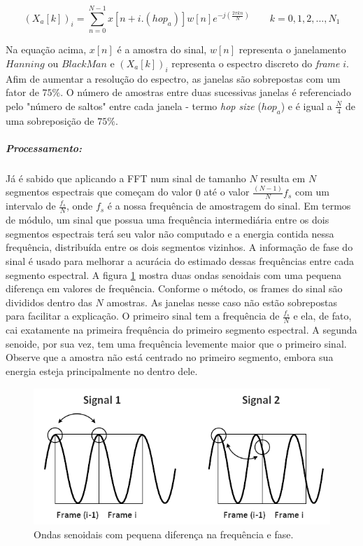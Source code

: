 					\begin{equation}
						(X_a[k])_i = \sum_{n=0}^{N-1}x[n+i.(hop_a)]w[n]e^{-j(\frac{2\pi kn}{N})}
						\qquad k = 0,1,2,...,N_1
						\label{eq-phase-vocoder01}
					\end{equation}
					
					Na equação acima, $ x[n] $ é a amostra do sinal, $ w[n] $ representa o janelamento $ Hanning $ ou $ BlackMan $ e $ (X_a[k])_i $ representa o espectro discreto do \textit{frame} $ i $. Afim de aumentar a resolução do espectro, as janelas são sobrepostas com um fator de $ 75\% $. O número de amostras entre duas sucessivas janelas é referenciado pelo "número de saltos" entre cada janela -  termo \textit{hop size} ($ hop_a $) e é igual a $ \frac{N}{4} $ de uma sobreposição de $ 75\% $.
				
				
				\subparagraph{Processamento:}
				
					Já é sabido que aplicando a FFT num sinal de tamanho $ N $ resulta em $ N $ segmentos espectrais que começam do valor $ 0 $ até o valor $ \frac{(N-1)}{N}f_s $ com um intervalo de $ \frac{f_s}{N} $, onde $ f_s $ é a nossa frequência de amostragem do sinal. Em termos de módulo, um sinal que possua uma frequência intermediária entre os dois segmentos espectrais terá seu valor não computado e a energia contida nessa frequência, distribuída entre os dois segmentos vizinhos. A informação de fase do sinal é usado para melhorar a acurácia do estimado dessas frequências entre cada segmento espectral. A figura \ref{fig-phase-vocoder02} mostra duas ondas senoidais com uma pequena diferença em valores de frequência. Conforme o método, os frames do sinal são divididos dentro das $ N $ amostras. As janelas nesse caso não estão sobrepostas para facilitar a explicação. O primeiro sinal tem a frequência de $ \frac{f_s}{N} $ e ela, de fato, cai exatamente na primeira frequência do primeiro segmento espectral. A segunda senoide, por sua vez, tem uma frequência levemente maior que o primeiro sinal. Observe que a amostra não está centrado no primeiro segmento, embora sua energia esteja principalmente no dentro dele.
				
					\begin{figure}[ht!]
						\centering
						\includegraphics[scale=0.5]{./figuras/phase-vocoder-03.PNG}
						\caption{Ondas senoidais com pequena diferença na frequência e fase.}
						\label{fig-phase-vocoder02}
					\end{figure}
				
